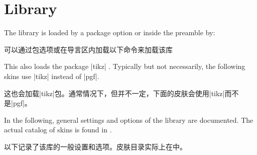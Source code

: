\section{Library }\label{sec:skins}%
%
The library is loaded by a package option or inside the preamble by:

可以通过包选项或在导言区内加载以下命令来加载该库
\begin{dispListing}
\end{dispListing}
This also loads the package |tikz| \cite{tantau:tikz_and_pgf}. Typically but not necessarily,
the following skins use |tikz| instead of |pgf|.

这也会加载|tikz|包\cite{tantau:tikz_and_pgf}。通常情况下，但并不一定，下面的皮肤会使用|tikz|而不是|pgf|。

In the following, general settings and options of the library are
documented.
The actual catalog of skins is found in .

以下记录了该库的一般设置和选项。皮肤目录实际上在中。

% 
% 
% 





